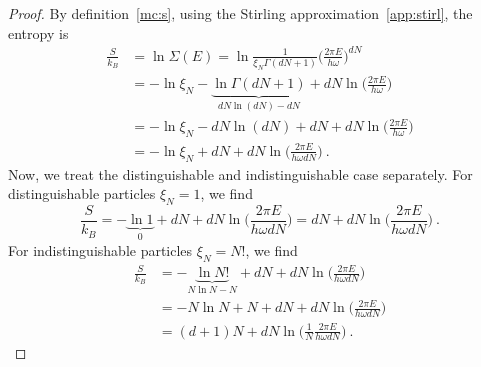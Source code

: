     \begin{proof}
        By definition~\eqref{mc:s}, using the Stirling approximation~\eqref{app:stirl}, the entropy is
        \begin{equation*}
        \begin{aligned}
            \frac{S}{k_B} & = \ln \Sigma (E) = \ln \frac{1}{\xi_N \Gamma(dN + 1)} \Big ( \frac{2 \pi E}{h \omega} \Big)^{dN} \\ & = - \ln \xi_N - \underbrace{\ln \Gamma (dN + 1)}_{dN \ln (dN) - dN} + d N \ln \Big (\frac{2 \pi E }{h \omega} \Big ) \\ & = - \ln \xi_N - dN \ln (dN) + d N + dN \ln \Big (\frac{2 \pi E }{h \omega} \Big ) \\ & = - \ln \xi_N + d N + d N \ln \Big (\frac{2 \pi E }{h \omega d N} \Big ) ~.
        \end{aligned}
        \end{equation*}
        Now, we treat the distinguishable and indistinguishable case separately. For distinguishable particles $\xi_N = 1$, we find
        \begin{equation*}
            \frac{S}{k_B} = - \underbrace{\ln 1}_0 + d N + d N \ln \Big (\frac{2 \pi E }{h \omega d N} \Big ) = d N + d N \ln \Big (\frac{2 \pi E }{h \omega d N} \Big ) ~.
        \end{equation*}
        For indistinguishable particles $\xi_N = N!$, we find
        \begin{equation*}
        \begin{aligned}
            \frac{S}{k_B} & = - \underbrace{\ln N!}_{N \ln N - N} + d N + d N \ln \Big (\frac{2 \pi E }{h \omega d N} \Big ) \\ & =  - N \ln N + N + d N + d N \ln \Big (\frac{2 \pi E }{h \omega d N} \Big ) \\ & = (d+1) N + d N \ln \Big ( \frac{1}{N} \frac{2 \pi E }{h \omega d N} \Big ) ~.
        \end{aligned}
        \end{equation*}
    \end{proof}

